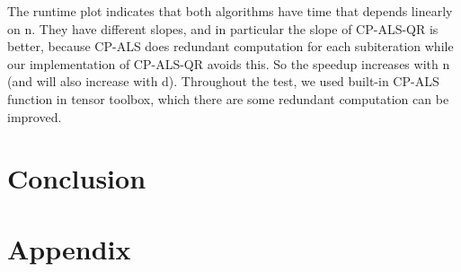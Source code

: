 \documentclass{article}
\begin{document}
The runtime plot indicates that both algorithms have time that depends linearly on n.  
They have different slopes, and in particular the slope of CP-ALS-QR is better, 
because CP-ALS does redundant computation for each subiteration while our implementation 
of CP-ALS-QR avoids this.  So the speedup increases with n (and will also increase with d).
Throughout the test, we used built-in CP-ALS function in tensor toolbox, which there are some redundant computation 
can be improved.




\section{Conclusion}





\section{Appendix}
\end{document}

